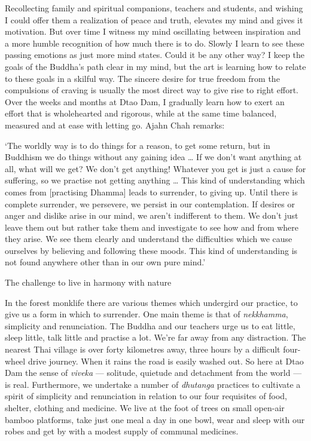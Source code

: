 Recollecting family and spiritual companions, teachers and students, and
wishing I could offer them a realization of peace and truth, elevates my
mind and gives it motivation. But over time I witness my mind
oscillating between inspiration and a more humble recognition of how
much there is to do. Slowly I learn to see these passing emotions as
just more mind states. Could it be any other way? I keep the goals of
the Buddha's path clear in my mind, but the art is learning how to
relate to these goals in a skilful way. The sincere desire for true
freedom from the compulsions of craving is usually the most direct way
to give rise to right effort. Over the weeks and months at Dtao Dam, I
gradually learn how to exert an effort that is wholehearted and
rigorous, while at the same time balanced, measured and at ease with
letting go. Ajahn Chah remarks:

`The worldly way is to do things for a reason, to get some return, but
in Buddhism we do things without any gaining idea \ldots{} If we don't
want anything at all, what will we get? We don't get anything! Whatever
you get is just a cause for suffering, so we practise not getting
anything \ldots{} This kind of understanding which comes from
{[}practising Dhamma{]} leads to surrender, to giving up. Until there is
complete surrender, we persevere, we persist in our contemplation. If
desires or anger and dislike arise in our mind, we aren't indifferent to
them. We don't just leave them out but rather take them and investigate
to see how and from where they arise. We see them clearly and understand
the difficulties which we cause ourselves by believing and following
these moods. This kind of understanding is not found anywhere other than
in our own pure mind.'

The challenge to live in harmony with nature

In the forest monklife there are various themes which undergird our
practice, to give us a form in which to surrender. One main theme is
that of \emph{nekkhamma}, simplicity and renunciation. The Buddha and
our teachers urge us to eat little, sleep little, talk little and
practise a lot. We're far away from any distraction. The nearest Thai
village is over forty kilometres away, three hours by a difficult
four-wheel drive journey. When it rains the road is easily washed out.
So here at Dtao Dam the sense of \emph{viveka} --- solitude, quietude
and detachment from the world --- is real. Furthermore, we undertake a
number of \emph{dhutanga} practices to cultivate a spirit of simplicity
and renunciation in relation to our four requisites of food, shelter,
clothing and medicine. We live at the foot of trees on small open-air
bamboo platforms, take just one meal a day in one bowl, wear and sleep
with our robes and get by with a modest supply of communal medicines.

